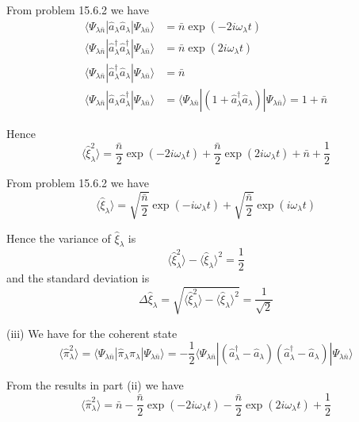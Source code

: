 From problem 15.6.2 we have
\begin{align*}
\langle\Psi_{\lambda\bar n}|\hat a_\lambda\hat a_\lambda|\Psi_{\lambda\bar n}\rangle
&=\bar n\exp(-2i\omega_\lambda t)
\\
\langle\Psi_{\lambda\bar n}|\hat a_\lambda^\dag\hat a_\lambda^\dag|\Psi_{\lambda\bar n}\rangle
&=\bar n\exp(2i\omega_\lambda t)
\\
\langle\Psi_{\lambda\bar n}|\hat a_\lambda^\dag\hat a_\lambda|\Psi_{\lambda\bar n}\rangle
&=\bar n
\\
\langle\Psi_{\lambda\bar n}|\hat a_\lambda\hat a_\lambda^\dag|\Psi_{\lambda\bar n}\rangle
&=\langle\Psi_{\lambda\bar n}|\left(1+\hat a_\lambda^\dag\hat a_\lambda\right)|\Psi_{\lambda\bar n}\rangle
=1+\bar n
\end{align*}

Hence
\begin{equation*}
\langle\hat\xi_\lambda^2\rangle
=\frac{\bar n}{2}\exp(-2i\omega_\lambda t)+\frac{\bar n}{2}\exp(2i\omega_\lambda t)+\bar n+\frac{1}{2}
\end{equation*}

From problem 15.6.2 we have
\begin{equation*}
\langle\hat\xi_\lambda\rangle
=\sqrt{\frac{\bar n}{2}}\exp(-i\omega_\lambda t)+\sqrt{\frac{\bar n}{2}}\exp(i\omega_\lambda t)
\end{equation*}

Hence the variance of $\hat\xi_\lambda$ is
\begin{equation*}
\langle\hat\xi_\lambda^2\rangle-\langle\hat\xi_\lambda\rangle^2=\frac{1}{2}
\end{equation*}
and the standard deviation is
\begin{equation*}
\Delta\hat\xi_\lambda=\sqrt{\langle\hat\xi_\lambda^2\rangle-\langle\hat\xi_\lambda\rangle^2}=\frac{1}{\sqrt2}
\end{equation*}

(iii) We have for the coherent state
\begin{equation*}
\langle\hat\pi_\lambda^2\rangle
=\langle\Psi_{\lambda\bar n}|\hat\pi_\lambda\hat\pi_\lambda|\Psi_{\lambda\bar n}\rangle
=-\frac{1}{2}\langle\Psi_{\lambda\bar n}|
\left(\hat a_\lambda^\dag-\hat a_\lambda\right)
\left(\hat a_\lambda^\dag-\hat a_\lambda\right)
|\Psi_{\lambda\bar n}\rangle
\end{equation*}

From the results in part (ii) we have
\begin{equation*}
\langle\hat\pi_\lambda^2\rangle
=\bar n-\frac{\bar n}{2}\exp(-2i\omega_\lambda t)-\frac{\bar n}{2}\exp(2i\omega_\lambda t)+\frac{1}{2}
\end{equation*}


